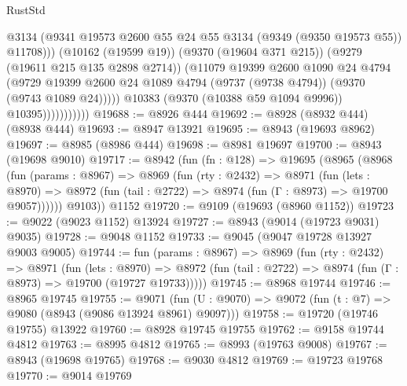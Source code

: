 \begin{lexlean}{RustStd}
\begin{coremodule}
                                @3134
                                (@9341
                                  @19573
                                  @2600
                                  @55
                                  @24
                                  @55
                                  @3134
                                  (@9349 (@9350 @19573 @55))
                                  @11708)))
                            (@10162 (@19599 @19))
                            (@9370 (@19604 @371 @215))
                            (@9279 (@19611 @215 @135 @2898 @2714))
                            (@11079
                              @19399
                              @2600
                              @1090
                              @24
                              @4794
                              (@9729
                                @19399
                                @2600
                                @24
                                @1089
                                @4794
                                (@9737 (@9738 @4794))
                                (@9370 (@9743 @1089 @24)))))
                          @10383
                          (@9370 (@10388 @59 @1094 @9996))
                          @10395)))))))))))
@19688 := @8926 @444
@19692 := @8928 (@8932 @444) (@8938 @444)
@19693 := @8947 @13921
@19695 := @8943 (@19693 @8962)
@19697 := @8985 (@8986 @444)
@19698 := @8981 @19697
@19700 := @8943 (@19698 @9010)
@19717 := @8942
    (fun (fn : @128) =>
    @19695
      (@8965
        (@8968
          (fun (params : @8967) =>
          @8969
            (fun (rty : @2432) =>
            @8971
              (fun (lets : @8970) =>
              @8972 (fun (tail : @2722) => @8974 (fun (Γ : @8973) => @19700 @9057))))))
        @9103))
    @1152
@19720 := @9109 (@19693 (@8960 @1152))
@19723 := @9022 (@9023 @1152) @13924
@19727 := @8943 (@9014 (@19723 @9031) @9035)
@19728 := @9048 @1152
@19733 := @9045 (@9047 @19728 @13927 @9003 @9005)
@19744 := fun (params : @8967) =>
  @8969
    (fun (rty : @2432) =>
    @8971
      (fun (lets : @8970) =>
      @8972 (fun (tail : @2722) => @8974 (fun (Γ : @8973) => @19700 (@19727 @19733)))))
@19745 := @8968 @19744
@19746 := @8965 @19745
@19755 := @9071
    (fun (U : @9070) => @9072 (fun (t : @7) => @9080 (@8943 (@9086 @13924 @8961) @9097)))
@19758 := @19720 (@19746 @19755) @13922
@19760 := @8928 @19745 @19755
@19762 := @9158 @19744 @4812
@19763 := @8995 @4812
@19765 := @8993 (@19763 @9008)
@19767 := @8943 (@19698 @19765)
@19768 := @9030 @4812
@19769 := @19723 @19768
@19770 := @9014 @19769

\end{coremodule}
\end{lexlean}
